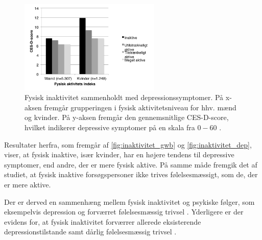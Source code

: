 \begin{figure}[H]
\centering
\includegraphics[width=0.6\textwidth]{figures/inaktivitet_dep}
\caption{Fysisk inaktivitet sammenholdt med depressionssymptomer. På x-aksen fremgår grupperingen i fysisk aktivitetsniveau for hhv. mænd og kvinder. På y-aksen fremgår den gennemsnitlige CES-D-score, hvilket indikerer depressive symptomer på en skala fra $0-60$ \citep{galper2006}.}
\label{fig:inaktivitet_dep}
\end{figure}

\noindent
Resultater herfra, som fremgår af \autoref{fig:inaktivitet_gwb} og \autoref{fig:inaktivitet_dep}, viser, at fysisk inaktive, især kvinder, har en højere tendens til depressive symptomer, end andre, der er mere fysisk aktive. På samme måde fremgik det af studiet, at fysisk inaktive forsøgspersoner  ikke trives følelsesmæssigt, som de, der er mere aktive. 

Der er derved en sammenhæng mellem fysisk inaktivitet og psykiske følger, som eksempelvis depression og forværret følelsesmæssig trivsel \citep{galper2006}. Yderligere er der evidens for, at fysisk inaktivitet forværrer allerede eksisterende depressionstilstande samt dårlig følelsesmæssig trivsel \citep{motionsraad2007}.
